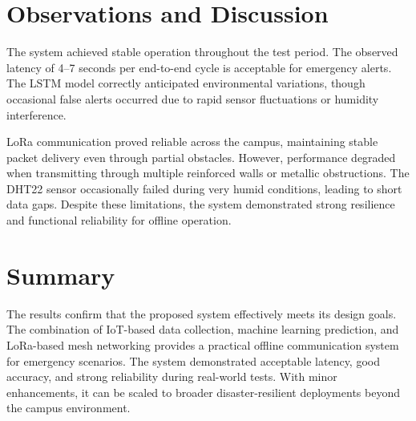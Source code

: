 \section{Observations and Discussion}
The system achieved stable operation throughout the test period. The observed latency of 4–7 seconds per end-to-end cycle is acceptable for emergency alerts. The LSTM model correctly anticipated environmental variations, though occasional false alerts occurred due to rapid sensor fluctuations or humidity interference.

LoRa communication proved reliable across the campus, maintaining stable packet delivery even through partial obstacles. However, performance degraded when transmitting through multiple reinforced walls or metallic obstructions. The DHT22 sensor occasionally failed during very humid conditions, leading to short data gaps. Despite these limitations, the system demonstrated strong resilience and functional reliability for offline operation.

\section{Summary}
The results confirm that the proposed system effectively meets its design goals. The combination of IoT-based data collection, machine learning prediction, and LoRa-based mesh networking provides a practical offline communication system for emergency scenarios. The system demonstrated acceptable latency, good accuracy, and strong reliability during real-world tests. With minor enhancements, it can be scaled to broader disaster-resilient deployments beyond the campus environment.
